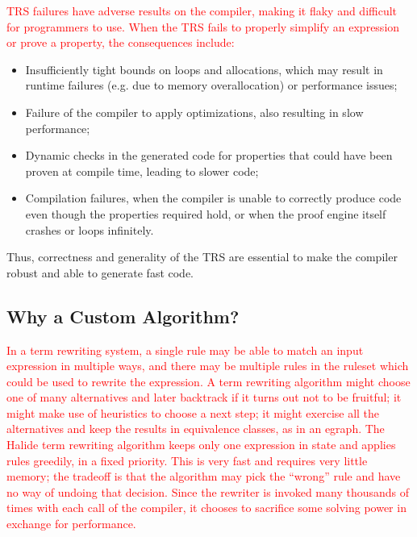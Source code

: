 \documentclass[acmsmall,review]{acmart}\settopmatter{printfolios=true,printccs=false,printacmref=false}
\newcommand{\modified}[1]{\textcolor{red}{{#1}}}
\begin{document}
\modified{TRS failures have adverse results on the compiler, making it flaky and
  difficult for programmers to use.  When the TRS fails to properly simplify an expression or
  prove a property, the consequences include: }
\begin{itemize}
\item Insufficiently tight bounds on loops and allocations, which may result in
  runtime failures (e.g. due to memory overallocation) or performance issues;

\item Failure of the compiler to apply optimizations, also resulting in slow performance;

\item Dynamic checks in the generated code for properties that could have been proven
  at compile time, leading to slower code;

\item Compilation failures, when the compiler is unable to correctly produce code
  even though the properties required hold, or when the proof engine itself crashes
  or loops infinitely.
\end{itemize}

Thus, correctness and generality of the TRS are essential to make the compiler
robust and able to generate fast code.

\subsection{Why a Custom Algorithm?}
\label{sec:whycustom}

\modified{In a term rewriting system, a single rule may be able to match an input expression in 
multiple ways, and there may be multiple rules in the ruleset which could be used 
to rewrite the expression. A term rewriting algorithm might choose one of many alternatives 
and later backtrack if it turns out not to be fruitful; it might make use of 
heuristics to choose a next step; it might exercise all the alternatives and keep 
the results in equivalence classes, as in an egraph. The Halide term rewriting algorithm
keeps only one expression in state and applies rules greedily, in a fixed priority.
This is very fast and requires very little memory; the tradeoff is that the algorithm 
may pick the ``wrong'' rule and have no way of undoing that decision. 
Since the rewriter is invoked many thousands of times with each call of the compiler, 
it chooses to sacrifice some solving power in exchange for performance.}
\end{document}
